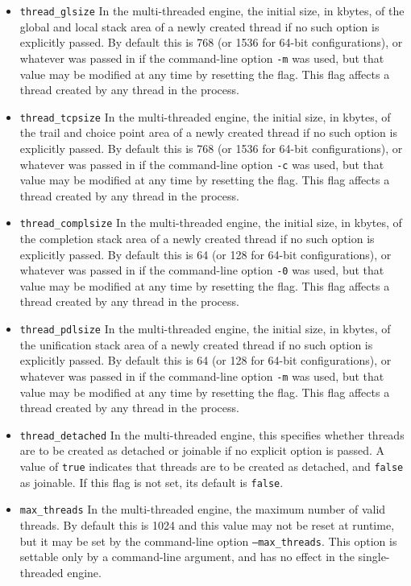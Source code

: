 \begin{description}
\begin{itemize}
\item {\tt thread\_glsize} In the multi-threaded engine, the initial
  size, in kbytes, of the global and local stack area of a newly
  created thread if no such option is explicitly passed.  By default
  this is 768 (or 1536 for 64-bit configurations), or whatever was
  passed in if the command-line option {\tt -m} was used, but that
  value may be modified at any time by resetting the flag.  This flag
  affects a thread created by any thread in the process.

\item {\tt thread\_tcpsize} In the multi-threaded engine, the initial
  size, in kbytes, of the trail and choice point area of a newly
  created thread if no such option is explicitly passed.  By default
  this is 768 (or 1536 for 64-bit configurations), or whatever was
  passed in if the command-line option {\tt -c} was used, but that
  value may be modified at any time by resetting the flag.  This flag
  affects a thread created by any thread in the process.

\item {\tt thread\_complsize} In the multi-threaded engine, the
  initial size, in kbytes, of the completion stack area of a newly
  created thread if no such option is explicitly passed.  By default
  this is 64 (or 128 for 64-bit configurations), or whatever was
  passed in if the command-line option {\tt -0} was used, but that
  value may be modified at any time by resetting the flag.  This flag
  affects a thread created by any thread in the process.

\item {\tt thread\_pdlsize} In the multi-threaded engine, the initial
  size, in kbytes, of the unification stack area of a newly created
  thread if no such option is explicitly passed.  By default this is
  64 (or 128 for 64-bit configurations), or whatever was passed in if
  the command-line option {\tt -m} was used, but that value may be
  modified at any time by resetting the flag.  This flag affects a
  thread created by any thread in the process.

\item {\tt thread\_detached} In the multi-threaded engine, this
  specifies whether threads are to be created as detached or joinable
  if no explicit option is passed.  A value of {\tt true} indicates
  that threads are to be created as detached, and {\tt false} as
  joinable.  If this flag is not set, its default is {\tt false}.

\item {\tt max\_threads} In the multi-threaded engine, the maximum
  number of valid threads.  By default this is 1024 and this value may
  not be reset at runtime, but it may be set by the command-line
  option {\tt --max\_threads}.  This option is settable only by a
  command-line argument, and has no effect in the single-threaded
  engine.


\end{itemize}
\end{description}
